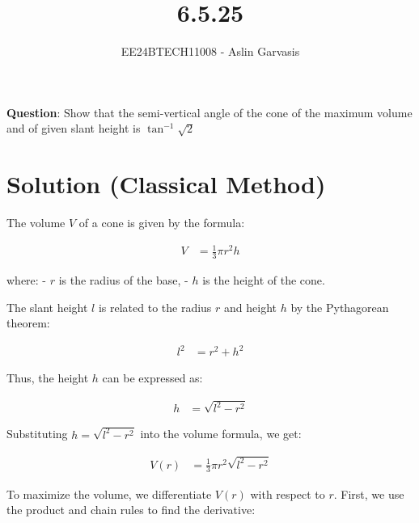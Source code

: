 \documentclass[journal]{IEEEtran}
\begin{document}
	

\vspace{3cm}
	
\title{6.5.25}
\author{EE24BTECH11008 - Aslin Garvasis}
{\let\newpage\relax\maketitle}
	
\renewcommand{\thefigure}{\theenumi}
\renewcommand{\thetable}{\theenumi}
\setlength{\intextsep}{10pt} %
	
\renewcommand{\thetable}{\theenumi}
	
	
\textbf{Question}:\newline
Show that the semi-vertical angle of the cone of the maximum volume and of given slant height is $\tan^{-1}\sqrt{2}$ \\


\section*{Solution (Classical Method)}

The volume \( V \) of a cone is given by the formula:

\begin{align}
V &= \frac{1}{3} \pi r^2 h
\end{align}

where:
- \( r \) is the radius of the base,
- \( h \) is the height of the cone.

The slant height \( l \) is related to the radius \( r \) and height \( h \) by the Pythagorean theorem:

\begin{align}
l^2 &= r^2 + h^2
\end{align}

Thus, the height \( h \) can be expressed as:

\begin{align}
h &= \sqrt{l^2 - r^2}
\end{align}

Substituting \( h = \sqrt{l^2 - r^2} \) into the volume formula, we get:

\begin{align}
V(r) &= \frac{1}{3} \pi r^2 \sqrt{l^2 - r^2}
\end{align}

To maximize the volume, we differentiate \( V(r) \) with respect to \( r \). First, we use the product and chain rules to find the derivative:
\end{document}
